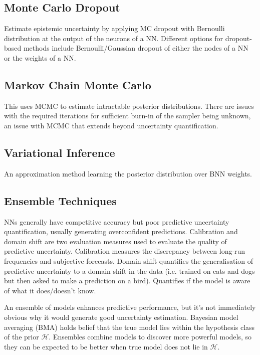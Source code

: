\documentclass[twoside,11pt]{article}
\begin{document}
\subsection{Monte Carlo Dropout}\label{subsec:monte-carlo-dropout}
Estimate epistemic uncertainty by applying MC dropout with Bernoulli distribution at the output of the neurons of a NN.
Different options for dropout-based methods include Bernoulli/Gaussian dropout of either the nodes of a NN or the weights of a NN.

\subsection{Markov Chain Monte Carlo}\label{subsec:markov-chain-monte-carlo}
This uses MCMC to estimate intractable posterior distributions.
There are issues with the required iterations for sufficient burn-in of the sampler being unknown, an issue with MCMC that extends beyond uncertainty quantification.

\subsection{Variational Inference}
An approximation method learning the posterior distribution over BNN weights.

\subsection{Ensemble Techniques}
NNs generally have competitive accuracy but poor predictive uncertainty quantification, usually generating overconfident predictions.
Calibration and domain shift are two evaluation measures used to evaluate the quality of predictive uncertainty.
Calibration measures the discrepancy between long-run frequencies and subjective forecasts.
Domain shift quantifies the generalisation of predictive uncertainty to a domain shift in the data (i.e. trained on cats and dogs but then asked to make a prediction on a bird).
Quantifies if the model is aware of what it does/doesn't know.

An ensemble of models enhances predictive performance, but it's not immediately obvious why it would generate good uncertainty estimation.
Bayesian model averaging (BMA) holds belief that the true model lies within the hypothesis class of the prior $\mathcal{H}$.
Ensembles combine models to discover more powerful models, so they can be expected to be better when true model does not lie in $\mathcal{H}$.
\end{document}
